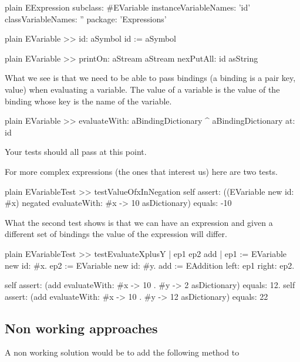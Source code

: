 \documentclass[10pt,twoside,english]{_support/latex/sbabook/sbabook}
\begin{document}
\begin{displaycode}{plain}
EExpression subclass: #EVariable
	instanceVariableNames: 'id'
	classVariableNames: ''
	package: 'Expressions'
\end{displaycode}

\begin{displaycode}{plain}
EVariable >> id: aSymbol
	id := aSymbol
\end{displaycode}

\begin{displaycode}{plain}
EVariable >> printOn: aStream
	aStream nexPutAll: id asString
\end{displaycode}

What we see is that we need to be able to pass bindings (a binding is a pair key, value) when evaluating a variable. The value of a variable is the value of the binding whose key is the name of the variable. 

\begin{displaycode}{plain}
EVariable >> evaluateWith: aBindingDictionary
	^ aBindingDictionary at: id
\end{displaycode}

Your tests should all pass at this point. 

For more complex expressions (the ones that interest us) here are two tests. 

\begin{displaycode}{plain}
EVariableTest >> testValueOfxInNegation
	self assert: ((EVariable new id: #x) negated
		evaluateWith: {#x -> 10} asDictionary) equals: -10
\end{displaycode}

What the second test shows is that we can have an expression and given a different set of bindings the value of the expression will differ. 

\begin{displaycode}{plain}
EVariableTest >> testEvaluateXplusY
	| ep1 ep2 add |
	ep1 := EVariable new id: #x.
	ep2 := EVariable new id: #y.
	add := EAddition left: ep1 right: ep2.
	
	self assert: (add evaluateWith: { #x -> 10 . #y -> 2 } asDictionary) equals: 12.
	self assert: (add evaluateWith: { #x -> 10 . #y -> 12 } asDictionary) equals: 22
\end{displaycode}
\subsection{Non working approaches}
A non working solution would be to add the following method to 
\end{document}
